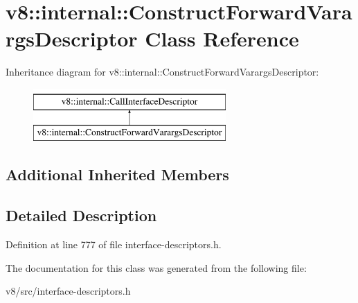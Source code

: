 \hypertarget{classv8_1_1internal_1_1ConstructForwardVarargsDescriptor}{}\section{v8\+:\+:internal\+:\+:Construct\+Forward\+Varargs\+Descriptor Class Reference}
\label{classv8_1_1internal_1_1ConstructForwardVarargsDescriptor}
Inheritance diagram for v8\+:\+:internal\+:\+:Construct\+Forward\+Varargs\+Descriptor\+:\begin{figure}[H]
\begin{center}
\leavevmode
\includegraphics[height=2.000000cm]{classv8_1_1internal_1_1ConstructForwardVarargsDescriptor}
\end{center}
\end{figure}
\subsection*{Additional Inherited Members}


\subsection{Detailed Description}


Definition at line 777 of file interface-\/descriptors.\+h.



The documentation for this class was generated from the following file\+:\begin{DoxyCompactItemize}
\item 
v8/src/interface-\/descriptors.\+h\end{DoxyCompactItemize}
